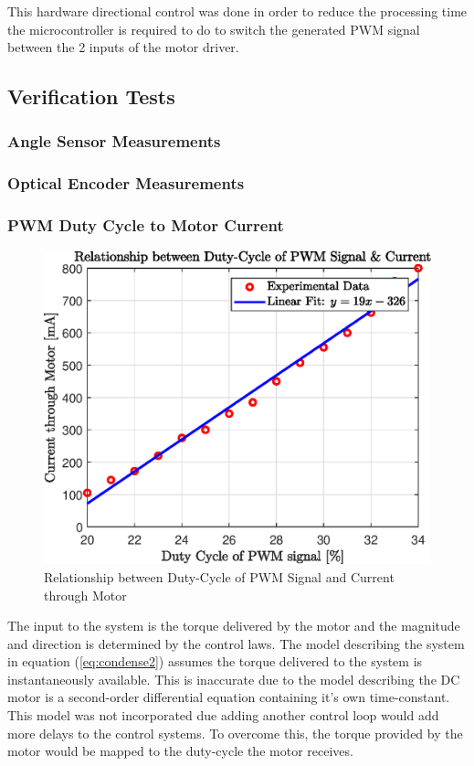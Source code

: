 This hardware directional control was done in order to reduce the processing time the microcontroller is required to do to switch the generated PWM signal between the 2 inputs of the motor driver.

\subsection{Verification Tests}

\subsubsection{Angle Sensor Measurements}

\subsubsection{Optical Encoder Measurements}

\subsubsection{ PWM Duty Cycle to Motor Current}

\begin{figure}[h]
	\centering
	\includegraphics[scale=1]{./figs/dutycycle_vs_current.eps}
	\caption{Relationship between Duty-Cycle of PWM Signal and Current through Motor}
	\label{fig:dutycycle_vs_current}
\end{figure}

The input to the system is the torque delivered by the motor and the magnitude and direction is determined by the control laws. The model describing the system in equation (\ref{eq:condense2}) assumes the torque delivered to the system is instantaneously available. This is inaccurate due to the model describing the DC motor is a second-order differential equation containing it's own time-constant. This model was not incorporated due adding another control loop would add more delays to the control systems. To overcome this, the torque provided by the motor would be mapped to the duty-cycle the motor receives.\\

